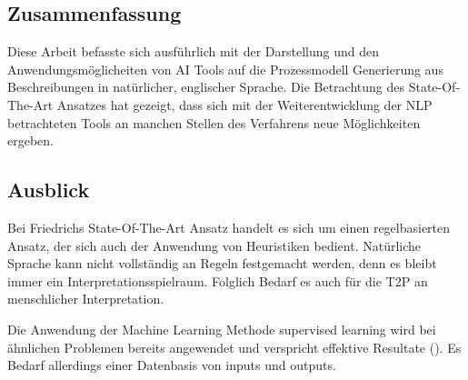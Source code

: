 \subsection{Zusammenfassung}
Diese Arbeit befasste sich ausführlich mit der Darstellung und den Anwendungsmöglicheiten von \ac{AI} Tools auf die Prozessmodell Generierung aus Beschreibungen in natürlicher, englischer Sprache. 
Die Betrachtung des State-Of-The-Art Ansatzes hat gezeigt, dass sich mit der Weiterentwicklung der \ac{NLP} betrachteten Tools an manchen Stellen des Verfahrens neue Möglichkeiten ergeben.

\subsection{Ausblick}
Bei Friedrichs State-Of-The-Art Ansatz handelt es sich um einen regelbasierten Ansatz, der sich auch der Anwendung von Heuristiken bedient. Natürliche Sprache kann nicht vollständig an Regeln festgemacht werden, denn es bleibt immer ein Interpretationsspielraum. Folglich Bedarf es auch für die \ac{T2P} an menschlicher Interpretation. \par
Die Anwendung der Machine Learning Methode supervised learning wird bei ähnlichen Problemen bereits angewendet und verspricht effektive Resultate (\cite[vgl.][2]{BPMML}). Es Bedarf allerdings einer Datenbasis von inputs und outputs.